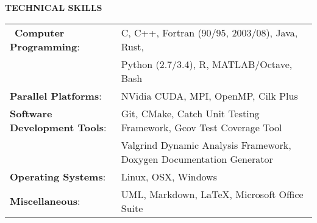 \documentclass[legalpaper]{article}
\begin{document}
\begin{center}
  \begin{shaded}
    { \color{white} \textbf{ TECHNICAL SKILLS}}
  \end{shaded}
\end{center}
\begin{tabular}{l p{5in}}
  ~\textbf{Computer Programming}: &  C, C++, Fortran (90/95, 2003/08), Java, Rust,\\
  & Python (2.7/3.4), R, MATLAB/Octave, Bash\\
  \rule{0pt}{4ex} \textbf{Parallel Platforms}:   &  NVidia CUDA, MPI, OpenMP, Cilk Plus\\
  \rule{0pt}{4ex} \textbf{Software Development Tools}:    &  Git, CMake, Catch Unit Testing Framework, Gcov Test Coverage Tool\\
  & Valgrind Dynamic Analysis Framework, Doxygen Documentation Generator\\
  \rule{0pt}{4ex} \textbf{Operating Systems}:    &  Linux, OSX, Windows\\
  \rule{0pt}{4ex} \textbf{Miscellaneous}:        &  UML, Markdown, \LaTeX, Microsoft Office Suite\\
\end{tabular}



\end{document}
